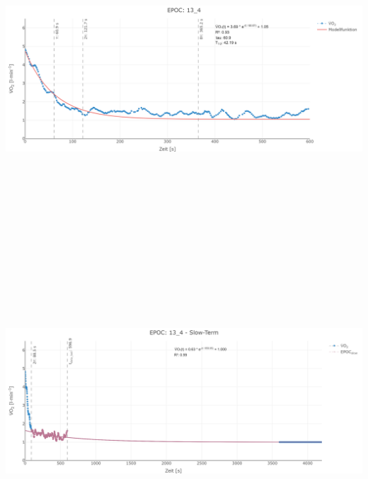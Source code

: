 \documentclass[
  letterpaper,
  DIV=11]{scrartcl}
\begin{document}
\includegraphics[width=11.45833in,height=4.6875in]{images/13_4_tau.png}
\includegraphics[width=11.45833in,height=4.6875in]{images/13_4_slow.png}
\end{document}
